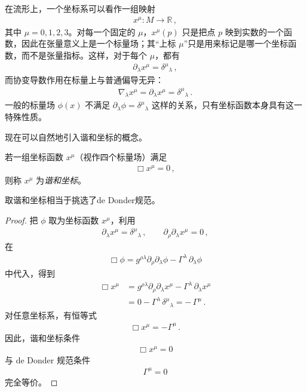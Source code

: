 \begin{derivationnote}
在流形上，一个坐标系可以看作一组映射
\begin{align}
x^{\mu} : M \longrightarrow \mathbb{R}\,,
\end{align}
其中 $\mu=0,1,2,3$。对每一个固定的 $\mu$，$x^{\mu}(p)$ 只是把点 $p$ 映到实数的一个函数，因此在张量意义上是一个标量场；其“上标 $\mu$”只是用来标记是哪一个坐标函数，而不是张量指标。这样，对于每个 $\mu$，都有
\begin{align}
\partial_{\lambda}x^{\mu} = \delta^{\mu}{}_{\lambda}\,,
\end{align}
而协变导数作用在标量上与普通偏导无异：
\begin{align}
\nabla_{\lambda}x^{\mu} = \partial_{\lambda}x^{\mu} = \delta^{\mu}{}_{\lambda}\,.
\end{align}
一般的标量场 $\phi(x)$ 不满足 $\partial_{\lambda}\phi = \delta^{\mu}{}_{\lambda}$ 这样的关系，只有坐标函数本身具有这一特殊性质。
\end{derivationnote}

现在可以自然地引入谐和坐标的概念。

\begin{definition}[谐和坐标]
若一组坐标函数 $x^{\mu}$（视作四个标量场）满足
\begin{align}
\Box x^{\mu} = 0\,,
\end{align}
则称 $x^{\mu}$ 为\emph{谐和坐标}。
\end{definition}

\begin{theorem}
    取谐和坐标相当于挑选了de Donder规范。
\end{theorem}
\begin{proof}
    把 $\phi$ 取为坐标函数 $x^{\mu}$，利用
\begin{align}
\partial_{\lambda}x^{\mu} = \delta^{\mu}{}_{\lambda}\,,\qquad
\partial_{\rho}\partial_{\lambda}x^{\mu} = 0\,,
\end{align}
在
\begin{align}
\Box\phi
=
g^{\rho\lambda}\partial_{\rho}\partial_{\lambda}\phi
-
\Gamma^{\lambda}\,\partial_{\lambda}\phi
\end{align}
中代入，得到
\begin{align}
\Box x^{\mu}
&=
g^{\rho\lambda}\partial_{\rho}\partial_{\lambda}x^{\mu}
-
\Gamma^{\lambda}\,\partial_{\lambda}x^{\mu}
\\[0.3em]
&=
0
-
\Gamma^{\lambda}\,\delta^{\mu}{}_{\lambda}
=
-\,\Gamma^{\mu}\,.
\end{align}
    对任意坐标系，有恒等式
    \begin{align}
        \Box x^{\mu} = -\Gamma^{\mu}\,.
    \end{align}
    因此，谐和坐标条件
    \begin{align}
        \Box x^{\mu} = 0
    \end{align}
    与 de Donder 规范条件
    \begin{align}
        \Gamma^{\mu} = 0
    \end{align}
    完全等价。
\end{proof}
